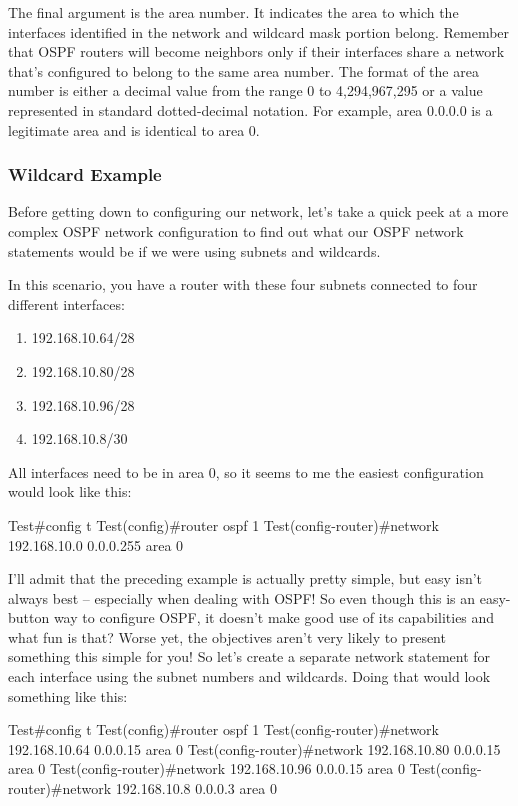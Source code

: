 The final argument is the area number. It indicates the area to which
the interfaces identified in the network and wildcard mask portion
belong. Remember that OSPF routers will become neighbors only if their
interfaces share a network that's configured to belong to the same area
number. The format of the area number is either a decimal value from the
range 0 to 4,294,967,295 or a value represented in standard
dotted-decimal notation. For example, area 0.0.0.0 is a legitimate area
and is identical to area 0.

\subsubsection{Wildcard Example}

Before getting down to configuring our network, let's take a quick peek
at a more complex OSPF network configuration to find out what our OSPF
network statements would be if we were using subnets and wildcards.

In this scenario, you have a router with these four subnets connected to
four different interfaces:

\begin{enumerate}
\item
  192.168.10.64/28
\item
  192.168.10.80/28
\item
  192.168.10.96/28
\item
  192.168.10.8/30
\end{enumerate}

All interfaces need to be in area 0, so it seems to me the easiest
configuration would look like this:

\begin{cli}
Test#config t
Test(config)#router ospf 1
Test(config-router)#network 192.168.10.0 0.0.0.255 area 0
\end{cli}

I'll admit that the preceding example is actually pretty simple, but
easy isn't always best -- especially when dealing with OSPF! So even
though this is an easy-button way to configure OSPF, it doesn't make
good use of its capabilities and what fun is that? Worse
\protect\hypertarget{c18.xhtmlux5cux23Page_756}{}{}yet, the objectives
aren't very likely to present something this simple for you! So let's
create a separate network statement for each interface using the subnet
numbers and wildcards. Doing that would look something like this:

\begin{cli}
Test#config t
Test(config)#router ospf 1
Test(config-router)#network 192.168.10.64 0.0.0.15 area 0
Test(config-router)#network 192.168.10.80 0.0.0.15 area 0
Test(config-router)#network 192.168.10.96 0.0.0.15 area 0
Test(config-router)#network 192.168.10.8 0.0.0.3 area 0
\end{cli}

